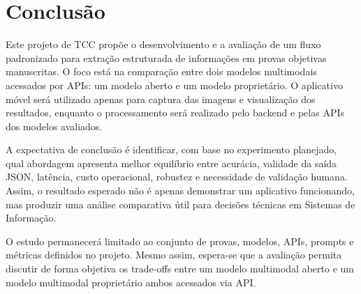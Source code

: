 \chapter{Conclusão}

Este projeto de TCC propõe o desenvolvimento e a avaliação de um fluxo padronizado para extração estruturada de informações em provas objetivas manuscritas. O foco está na comparação entre dois modelos multimodais acessados por APIs: um modelo aberto e um modelo proprietário. O aplicativo móvel será utilizado apenas para captura das imagens e visualização dos resultados, enquanto o processamento será realizado pelo backend e pelas APIs dos modelos avaliados.

A expectativa de conclusão é identificar, com base no experimento planejado, qual abordagem apresenta melhor equilíbrio entre acurácia, validade da saída JSON, latência, custo operacional, robustez e necessidade de validação humana. Assim, o resultado esperado não é apenas demonstrar um aplicativo funcionando, mas produzir uma análise comparativa útil para decisões técnicas em Sistemas de Informação.

O estudo permanecerá limitado ao conjunto de provas, modelos, APIs, prompts e métricas definidos no projeto. Mesmo assim, espera-se que a avaliação permita discutir de forma objetiva os trade-offs entre um modelo multimodal aberto e um modelo multimodal proprietário ambos acessados via API.
